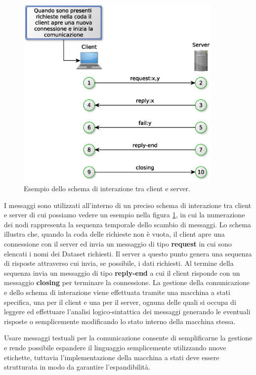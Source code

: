 \begin{figure}[t]
\begin{center}
\includegraphics[width=10cm]{Immagini/InterazioniClientServer}
\caption{Esempio dello schema di interazione tra client e server.\label{f:clientserverinteraction}} 
\end{center} 
\end{figure}

I messaggi sono utilizzati all'interno di un preciso schema di interazione tra client e server di cui possiamo vedere un esempio nella figura \ref{f:clientserverinteraction}, in cui la numerazione dei nodi rappresenta la sequenza temporale dello scambio di messaggi. 
Lo schema illustra che, quando la coda delle richieste non \`e vuota, il client apre una connessione con il server ed invia un messaggio di tipo \textbf{request} in cui sono elencati i nomi dei Dataset richiesti. Il server a questo punto genera una sequenza di risposte attraverso cui invia, se possibile, i dati richiesti. Al termine della sequenza invia un messaggio di tipo \textbf{reply-end} a cui il client risponde con un messaggio \textbf{closing} per terminare la connessione. La gestione della comunicazione e dello schema di interazione viene effettuata tramite una macchina a stati specifica, una per il client e una per il server, ognuna delle quali si occupa di leggere ed effettuare l'analisi logico-sintattica dei messaggi generando le eventuali risposte o semplicemente modificando lo stato interno della macchina stessa.

Usare messaggi testuali per la comunicazione consente di semplificarne la gestione e rende possibile espandere il linguaggio semplicemente utilizzando nuove etichette, tuttavia l'implementazione della macchina a stati deve essere strutturata in modo da garantire l'espandibilit\`a.

